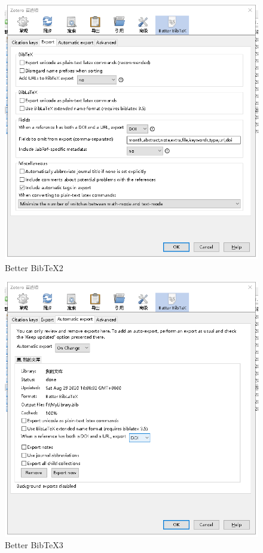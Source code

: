 \begin{figure}
	\centering
	\includegraphics[scale=0.8]{Fig/zotero10.png}
	\caption{\label{op10}Better BibTeX2}
\end{figure}
\begin{figure}
	\centering
	\includegraphics[scale=0.8]{Fig/zotero11.png}
	\caption{\label{op11}Better BibTeX3}
\end{figure}

